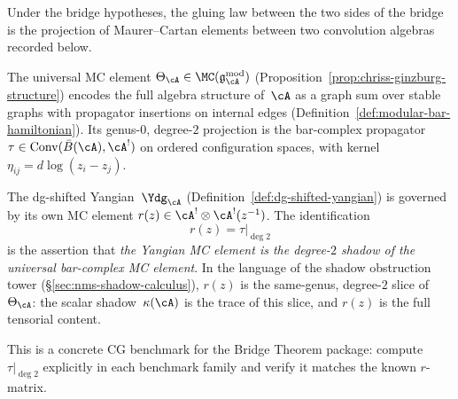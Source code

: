 \begin{remark}[The $r(z) = \tau|_{\deg 2}$ identification:
MC projection under the bridge hypotheses]
\label{rem:r-from-tau}
Under the bridge hypotheses, the gluing law between the two sides of
the bridge is the projection of Maurer--Cartan elements between two
convolution algebras recorded below.

The universal MC element $\Theta_\cA \in
\MC(\mathfrak{g}_\cA^{\mathrm{mod}})$
(Proposition~\ref{prop:chriss-ginzburg-structure}) encodes the full
algebra structure of~$\cA$ as a graph sum over stable graphs with
propagator insertions on internal edges
(Definition~\ref{def:modular-bar-hamiltonian}).
Its genus-$0$, degree-$2$ projection is the bar-complex propagator
$\tau \in \operatorname{Conv}(\bar B(\cA), \cA^!)$ on ordered configuration
spaces, with kernel
$\eta_{ij} = d\log(z_i - z_j)$.

The dg-shifted Yangian~$\Ydg_\cA$
(Definition~\ref{def:dg-shifted-yangian}) is governed by its own
MC element $r(z) \in \cA^! \otimes \cA^!(z^{-1})$.
The identification
\[
r(z) = \tau|_{\deg 2}
\]
is the assertion that \emph{the Yangian MC element is the
degree-$2$ shadow of the universal bar-complex MC element}.
In the language of the shadow obstruction tower
(\S\ref{sec:nms-shadow-calculus}), $r(z)$ is the
same-genus, degree-$2$ slice of~$\Theta_\cA$: the scalar
shadow~$\kappa(\cA)$ is the trace of this slice, and $r(z)$ is
the full tensorial content.

This is a concrete CG benchmark for the Bridge Theorem
package: compute $\tau|_{\deg 2}$ explicitly in each benchmark
family and verify it matches the known $r$-matrix.
\end{remark}

